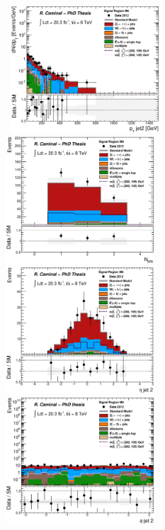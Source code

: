\begin{figure}[!ht]
  \begin{center}
    \mbox{
      \includegraphics[width=0.495\textwidth]{MonojetAnalysis/Figures/plot_Stop_A10_SR_pt2_fitted.eps}
      \includegraphics[width=0.495\textwidth]{MonojetAnalysis/Figures/plot_Stop_A10_SR_n_jets_fitted.eps}
    }
    \mbox{
      \includegraphics[width=0.495\textwidth]{MonojetAnalysis/Figures/plot_Stop_A10_SR_eta2_fitted.eps}
      \includegraphics[width=0.495\textwidth]{MonojetAnalysis/Figures/plot_Stop_A10_SR_phi2_fitted.eps}
}
\end{center}
\end{figure}
